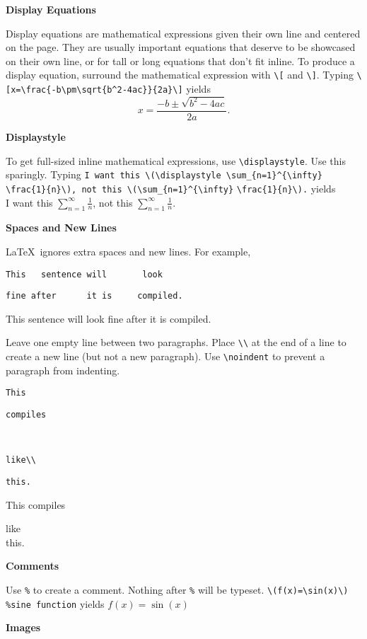 \documentclass[10pt,landscape]{article}
\newcommand{\ColorSection}[1]{\par\vspace{1.5ex}\noindent\textcolor{sectioncolor}{\Large\bfseries #1}\par\vspace{0.75ex}}
\newcommand{\ColorSubsection}[1]{\par\vspace{1ex}\noindent\textcolor{subsectioncolor}{\normalsize\bfseries #1}\par\vspace{0.5ex}}
\begin{document}
\begin{multicols}{3}
\ColorSubsection{Display Equations}
Display equations are mathematical expressions given their own line and centered on the page. They are usually important equations that deserve to be showcased on their own line, or for tall or long equations that don't fit inline. To produce a display equation, surround the mathematical expression with \verb!\[! and \verb!\]!. Typing \verb!\[x=\frac{-b\pm\sqrt{b^2-4ac}}{2a}\]! yields \[x=\frac{-b\pm\sqrt{b^2-4ac}}{2a}.\]
 
\ColorSubsection{Displaystyle} 
To get full-sized inline mathematical expressions, use  \verb!\displaystyle!. Use this sparingly. Typing \verb!I want this \(\displaystyle \sum_{n=1}^{\infty}! \verb!\frac{1}{n}\), not this \(\sum_{n=1}^{\infty}! \verb!\frac{1}{n}\).! yields\\ I want  this \(\displaystyle \sum_{n=1}^{\infty}\frac{1}{n}\), not this \(\sum_{n=1}^{\infty}\frac{1}{n}.\)



\columnbreak



\ColorSection{Spaces and New Lines}

\LaTeX\ ignores extra spaces and new lines. For example, 

\verb!This   sentence will       look!

\verb!fine after      it is     compiled.!

This   sentence will       look
fine after      it is     compiled.


Leave one empty line between two paragraphs. Place \verb!\\! at the end of a line to create a new line (but not a new paragraph). Use  \verb!\noindent! to prevent a paragraph from indenting.

\verb!This!

\verb!compiles!

~

\verb!like\\!

\verb!this.!

This
compiles 

like\\
this.



\ColorSection{Comments}

Use \verb!%! to create a comment. Nothing after \verb!%! will be typeset. \verb!\(f(x)=\sin(x)\) %sine function! yields \(f(x)=\sin(x)\)

\ColorSection{Images}


\end{multicols}
\end{document}
